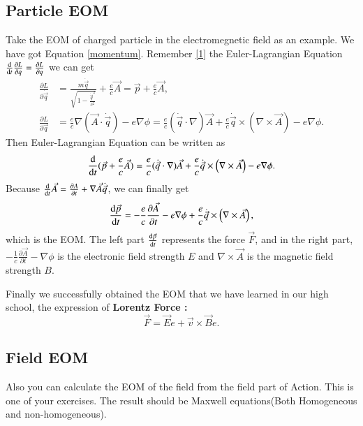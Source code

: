 \documentclass[openany,10pt]{book}
\theoremstyle{definition}
\theoremstyle{definition}
\theoremstyle{remark}
\begin{document}
\subsection{Particle EOM}
Take the EOM of charged particle in the electromegnetic field as an example. We have got Equation \ref{momentum}.
Remember \ref{1} the Euler-Lagrangian Equation $\frac{{\rm{d}}}{{\rm{d}}t}\frac{\partial L}{\partial \dot{q}}=\frac{\partial L}{\partial q}$
we can get 
\begin{equation}
\begin{aligned}
\frac{\partial L}{\partial \dot{\vec q}}&=\frac{m\dot{\vec q}}{\sqrt{1-\frac{\dot{\vec q}^2}{c^2}}}+\frac{e}{c}\vec{A}=\vec{p}+\frac{e}{c}\vec{A},\\
\frac{\partial L}{\partial \vec q}&=\frac{e}{c}\nabla(\vec{A}\cdot\dot{\vec q})-e\nabla\phi=\frac{e}{c}(\dot{\vec q}\cdot\nabla)\vec{A}+\frac{e}{c}\dot{\vec q}\times \left(\nabla\times\vec{A}\right)-e\nabla\phi.
\end{aligned}
\end{equation}
Then Euler-Lagrangian Equation can be written as
\begin{equation}
\frac{{\rm{d}}}{{\rm{d}}t}(\vec{p}+\frac{e}{c}\vec{A})=\frac{e}{c}(\dot{\vec q}\cdot\nabla)\vec{A}+\frac{e}{c}\dot{\vec q}\times\left(\nabla\times\vec{A}\right)-e\nabla\phi.
\end{equation}
Because $\frac{{\rm{d}}}{{\rm{d}}t}\vec{A}=\frac{\partial A}{\partial t}+\nabla\vec{A}\dot{\vec q}$, we can finally get 
\begin{equation}
\frac{{\rm{d}}\vec{p}}{{\rm{d}}t}=-\frac{e}{c}\frac{\partial\vec{A}}{\partial t}-e\nabla\phi+\frac{e}{c}\dot{\vec q}\times\left(\nabla\times\vec{A}\right),
\end{equation}
which is the EOM. The left part $\frac{{\rm{d}}\vec{p}}{{\rm{d}}t}$ represents the force $\vec F$, and in the right part, $-\frac1c\frac{\partial\vec A}{\partial t}-\nabla\phi$ is the electronic field strength $E$ and $\nabla\times\vec A$ is the magnetic field strength $B$.

Finally we successfully obtained the EOM that we have learned in our high school, the expression of \bfseries Lorentz Force :
\begin{equation}
    \vec F=\vec E e+\vec v\times \vec Be.
\end{equation}

\subsection{Field EOM}
Also you can calculate the EOM of the field from the field part of Action. This is one of your exercises. The result should be Maxwell equations(Both Homogeneous and non-homogeneous).
\end{document}
